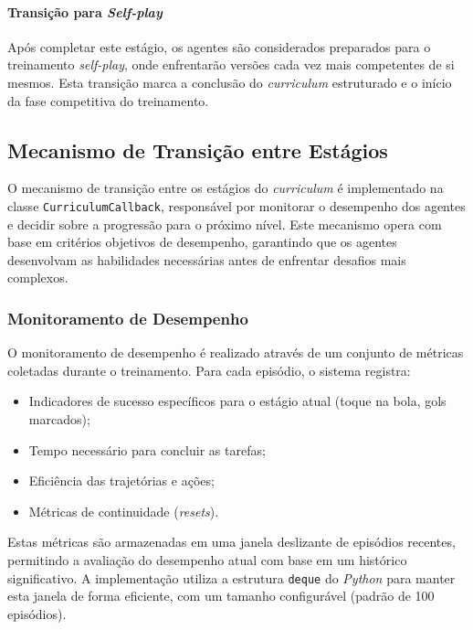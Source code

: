 \paragraph{Transição para \textit{Self-play}}

Após completar este estágio, os agentes são considerados preparados para o treinamento \textit{self-play}, onde enfrentarão versões cada vez mais competentes de si mesmos. Esta transição marca a conclusão do \textit{curriculum} estruturado e o início da fase competitiva do treinamento.

\subsection{Mecanismo de Transição entre Estágios}
\label{subsec:mecanismo_transicao}

O mecanismo de transição entre os estágios do \textit{curriculum} é implementado na classe \texttt{CurriculumCallback}, responsável por monitorar o desempenho dos agentes e decidir sobre a progressão para o próximo nível. Este mecanismo opera com base em critérios objetivos de desempenho, garantindo que os agentes desenvolvam as habilidades necessárias antes de enfrentar desafios mais complexos.

\subsubsection{Monitoramento de Desempenho}

O monitoramento de desempenho é realizado através de um conjunto de métricas coletadas durante o treinamento. Para cada episódio, o sistema registra:

\begin{itemize}
    \item Indicadores de sucesso específicos para o estágio atual (toque na bola, gols marcados);
    \item Tempo necessário para concluir as tarefas;
    \item Eficiência das trajetórias e ações;
    \item Métricas de continuidade (\textit{resets}).
\end{itemize}

Estas métricas são armazenadas em uma janela deslizante de episódios recentes, permitindo a avaliação do desempenho atual com base em um histórico significativo. A implementação utiliza a estrutura \texttt{deque} do \textit{Python} para manter esta janela de forma eficiente, com um tamanho configurável (padrão de 100 episódios).

